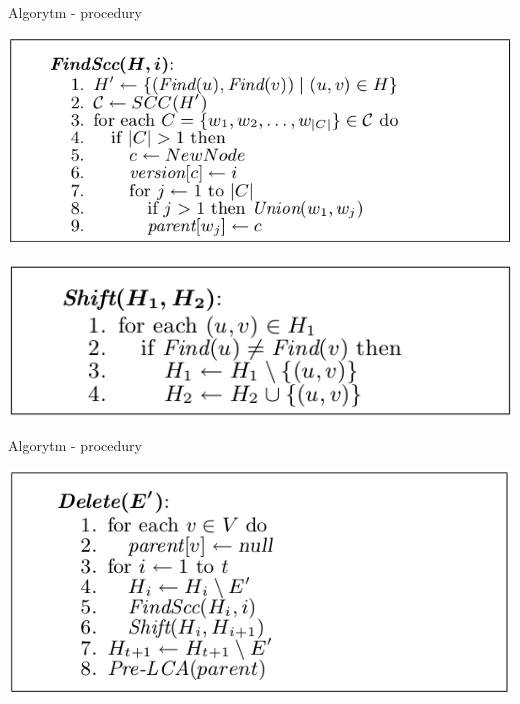 \documentclass{beamer}
\begin{document}
\begin{frame}{Algorytm - procedury}
\begin{center}
\includegraphics[scale=0.4]{img/FindScc.png}
\end{center}

\begin{center}
\includegraphics[scale=0.4]{img/Shift.png}
\end{center}
\end{frame}

\begin{frame}{Algorytm - procedury}
\begin{center}
\includegraphics[scale=0.4]{img/Delete.png}
\end{center}
\end{frame}
\end{document}
